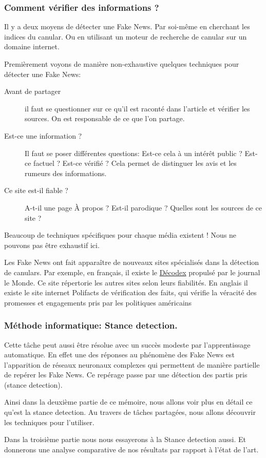 
\subsubsection{Comment vérifier des informations ?}
Il y a deux moyens de détecter une Fake News.
Par soi-même en cherchant les indices du canular.
Ou en utilisant un moteur de recherche de canular sur un domaine internet.

Premièrement voyons de manière non-exhaustive quelques techniques pour détecter une Fake News:
\begin{description}
 \item [Avant de partager] il faut se questionner sur ce qu'il est raconté dans l'article et vérifier les sources. On est responsable de ce que l'on partage.
 \item [Est-ce une information ?] Il faut se poser différentes questions: Est-ce cela à un intérêt public ? Est-ce factuel ? Est-ce vérifié ? Cela permet de distinguer les avis et les rumeurs des informations.
 \item [Ce site est-il fiable ?] A-t-il une page \og À propos \fg ? Est-il parodique ? Quelles sont les sources de ce site ?
\end{description}
Beaucoup de techniques spécifiques pour chaque média existent ! Nous ne pouvons pas être exhaustif ici.

Les Fake News ont fait apparaître de nouveaux sites spécialisés dans la détection de canulars.
Par exemple, en français, il existe le \href{http://www.lemonde.fr/verification/}{Décodex} propulsé par le journal le Monde. Ce site répertorie les autres sites selon leurs fiabilités.
En anglais il existe le site internet Polifacts de vérification des faits, qui vérifie la véracité des promesses et engagements pris par les politiques américains

\subsubsection{Méthode informatique: Stance detection.}
Cette tâche peut aussi être résolue avec un succès modeste par l'apprentissage automatique.
En effet une des réponses au phénomène des Fake News est l'apparition de réseaux neuronaux complexes qui permettent de manière partielle de repérer les Fake News. Ce repérage passe par une détection des partis pris (stance detection).

Ainsi dans la deuxième partie de ce mémoire, nous allons voir plus en détail ce qu'est la stance detection.
Au travers de tâches partagées, nous allons découvrir les techniques pour l'utiliser.

Dans la troisième partie nous nous essayerons à la Stance detection aussi.
Et donnerons une analyse comparative de nos résultats par rapport à l'état de l'art.
